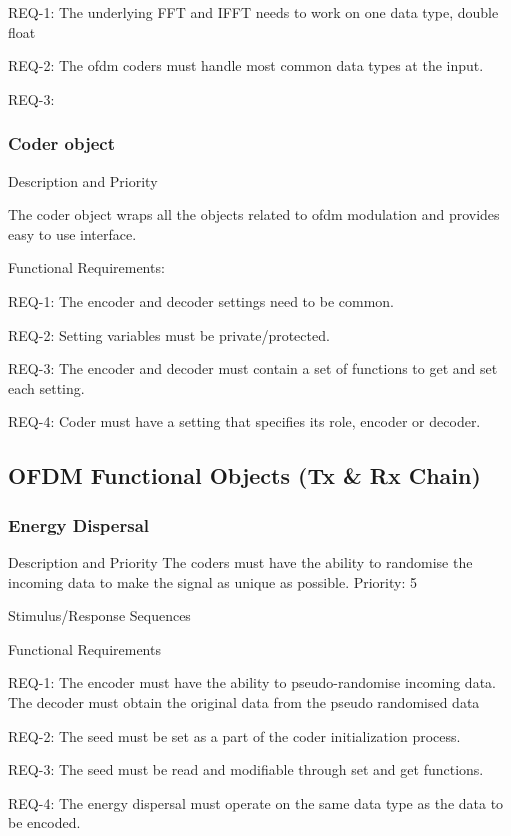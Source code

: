 \documentclass[]{report}
\begin{document}
REQ-1: The underlying FFT and IFFT needs to work on one data type, double float \par
REQ-2: The ofdm coders must handle most common data types at the input. \par
REQ-3: \par

\subsubsection{Coder object}

Description and Priority

The coder object wraps all the objects related to ofdm modulation and provides easy to use interface.

Functional Requirements:

REQ-1: The encoder and decoder settings need to be common. \par
REQ-2: Setting variables must be private/protected. \par
REQ-3: The encoder and decoder must contain a set of functions to get and set each setting. \par
REQ-4: Coder must have a setting that specifies its role, encoder or decoder. \par


\subsection{OFDM Functional Objects (Tx \& Rx Chain)}


\subsubsection{Energy Dispersal}

Description and Priority
The coders must have the ability to randomise the incoming data to make the signal as unique as possible.
Priority: 5

Stimulus/Response Sequences


Functional Requirements

REQ-1: The encoder must have the ability to pseudo-randomise incoming data. The decoder must obtain the original data from the pseudo randomised data \par
REQ-2: The seed must be set as a part of the coder initialization process. \par
REQ-3: The seed must be read and modifiable through set and get functions. \par
REQ-4: The energy dispersal must operate on the same data type as the data to be encoded. \par
\end{document}
